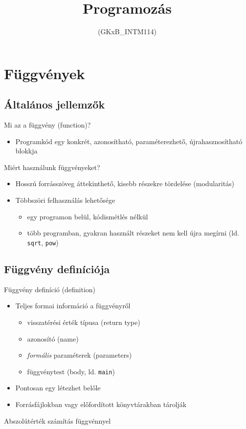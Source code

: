 \documentclass[usenames,dvipsnames,aspectratio=169]{beamer}
\title[5. előadás]{Programozás}
\subtitle{(GKxB\_INTM114)}
\begin{document}
\begin{frame}[plain]
  \titlepage
  \logoalul
\end{frame}

\section{Függvények}
\subsection{Általános jellemzők}
\begin{frame}
  Mi az a függvény (function)?
  \begin{itemize}
    \item[] Programkód egy konkrét, azonosítható, paraméterezhető, újrahasznosítható blokkja
  \end{itemize}
  \vfill
  Miért használunk függvényeket?
  \begin{itemize}
    \item Hosszú forrásszöveg áttekinthető, kisebb részekre tördelése (modularitás)
    \item Többszöri felhasználás lehetősége
    \begin{itemize}
      \item egy programon belül, kódismétlés nélkül
      \item több programban, gyakran használt részeket nem kell újra megírni (ld. \texttt{sqrt}, \texttt{pow})
    \end{itemize}
  \end{itemize}
\end{frame}

\subsection{Függvény definíciója}
\begin{frame}
  Függvény definíció (definition)
  \begin{itemize}
    \item Teljes formai információ a függvényről
    \begin{itemize}
      \item visszatérési érték típusa (return type)
      \item azonosító (name)
      \item \emph{formális} paraméterek (parameters)
      \item függvénytest (body, ld. \texttt{main})
    \end{itemize}
    \item Pontosan egy létezhet belőle
    \item Forrásfájlokban vagy előfordított könyvtárakban tárolják
  \end{itemize}
  \begin{exampleblock}{ Abszolútérték számítás függvénnyel}
    \small
    \vspace{-.2cm}
    
    \vspace{-.2cm}
  \end{exampleblock}
\end{frame}
\end{document}
